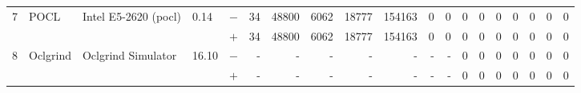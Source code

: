 \begin{tabular}{lllll | rrrrrrr | rrrrrrr }
\hline
\multirow{ 2}{*}{7} & \multirow{ 2}{*}{POCL} & \multirow{ 2}{*}{Intel E5-2620 (pocl)} & \multirow{ 2}{*}{0.14} & $-$ & 34 & 48800 & 6062 & 18777 & 154163 & 0 & 0 & 0 & 0 & 0 & 0 & 0 & 0 & 0 \\& & & & $+$ & 34 & 48800 & 6062 & 18777 & 154163 & 0 & 0 & 0 & 0 & 0 & 0 & 0 & 0 & 0 \\
\hline
\multirow{ 2}{*}{8} & \multirow{ 2}{*}{Oclgrind} & \multirow{ 2}{*}{Oclgrind Simulator} & \multirow{ 2}{*}{16.10} & $-$ & - & - & - & - & - & - & - & 0 & 0 & 0 & 0 & 0 & 0 & 0 \\& & & & $+$ & - & - & - & - & - & - & - & 0 & 0 & 0 & 0 & 0 & 0 & 0 \\
  \bottomrule
\end{tabular}

